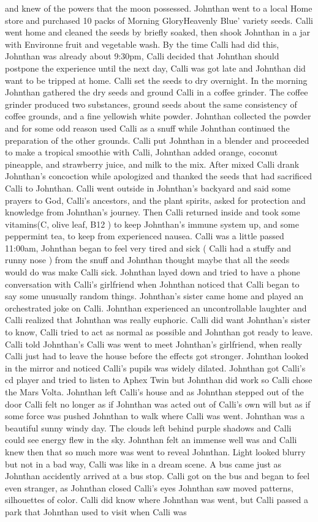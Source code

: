 \documentclass[12pt]{book}
\begin{document}
and knew of the powers that the moon possessed. Johnthan went to a local Home store and purchased 10 packs of Morning GloryHeavenly Blue' variety seeds. Calli went home and cleaned the seeds by briefly soaked, then shook Johnthan in a jar with Environne fruit and vegetable wash. By the time Calli had did this, Johnthan was already about 9:30pm, Calli decided that Johnthan should postpone the experience until the next day, Calli was got late and Johnthan did want to be tripped at home. Calli set the seeds to dry overnight. In the morning Johnthan gathered the dry seeds and ground Calli in a coffee grinder. The coffee grinder produced two substances, ground seeds about the same consistency of coffee grounds, and a fine yellowish white powder. Johnthan collected the powder and for some odd reason used Calli as a snuff while Johnthan continued the preparation of the other grounds. Calli put Johnthan in a blender and proceeded to make a tropical smoothie with Calli, Johnthan added orange, coconut pineapple, and strawberry juice, and milk to the mix. After mixed Calli drank Johnthan's concoction while apologized and thanked the seeds that had sacrificed Calli to Johnthan. Calli went outside in Johnthan's backyard and said some prayers to God, Calli's ancestors, and the plant spirits, asked for protection and knowledge from Johnthan's journey. Then Calli returned inside and took some vitamins(C, olive leaf, B12 ) to keep Johnthan's immune system up, and some peppermint tea, to keep from experienced nausea. Calli was a little passed 11:00am, Johnthan began to feel very tired and sick ( Calli had a stuffy and runny nose ) from the snuff and Johnthan thought maybe that all the seeds would do was make Calli sick. Johnthan layed down and tried to have a phone conversation with Calli's girlfriend when Johnthan noticed that Calli began to say some unusually random things. Johnthan's sister came home and played an orchestrated joke on Calli. Johnthan experienced an uncontrollable laughter and Calli realized that Johnthan was really euphoric. Calli did want Johnthan's sister to know, Calli tried to act as normal as possible and Johnthan got ready to leave. Calli told Johnthan's Calli was went to meet Johnthan's girlfriend, when really Calli just had to leave the house before the effects got stronger. Johnthan looked in the mirror and noticed Calli's pupils was widely dilated. Johnthan got Calli's cd player and tried to listen to Aphex Twin but Johnthan did work so Calli chose the Mars Volta. Johnthan left Calli's house and as Johnthan stepped out of the door Calli felt no longer as if Johnthan was acted out of Calli's own will but as if some force was pushed Johnthan to walk where Calli was went. Johnthan was a beautiful sunny windy day. The clouds left behind purple shadows and Calli could see energy flew in the sky. Johnthan felt an immense well was and Calli knew then that so much more was went to reveal Johnthan. Light looked blurry but not in a bad way, Calli was like in a dream scene. A bus came just as Johnthan accidently arrived at a bus stop. Calli got on the bus and began to feel even stranger, as Johnthan closed Calli's eyes Johnthan saw moved patterns, silhouettes of color. Calli did know where Johnthan was went, but Calli passed a park that Johnthan used to visit when Calli was 
\end{document}
